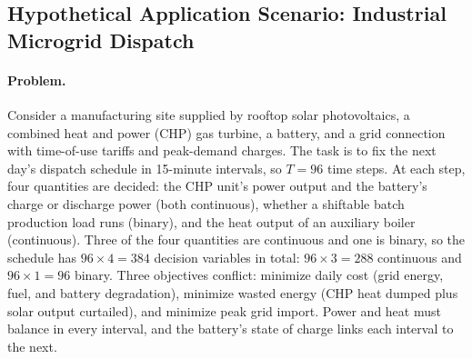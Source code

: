\subsection{Hypothetical Application Scenario: Industrial Microgrid Dispatch}
\label{sec:case-study:scenario-microgrid}

\paragraph{Problem.}
Consider a manufacturing site supplied by rooftop solar photovoltaics,
a combined heat and power (CHP) gas turbine, a battery, and a grid
connection with time-of-use tariffs and peak-demand charges. The task
is to fix the next day's dispatch schedule in 15-minute intervals, so
$T{=}96$ time steps. At each step, four quantities are decided: the
CHP unit's power output and the battery's charge or discharge power
(both continuous), whether a shiftable batch production load runs
(binary), and the heat output of an auxiliary boiler (continuous).
Three of the four quantities are continuous and one is binary, so the
schedule has $96 \times 4 = 384$ decision variables in total:
$96 \times 3 = 288$ continuous and $96 \times 1 = 96$ binary. Three objectives conflict: minimize daily cost (grid energy,
fuel, and battery degradation), minimize wasted energy (CHP heat dumped
plus solar output curtailed), and minimize peak grid import. Power and
heat must balance in every interval, and the battery's state of charge
links each interval to the next.


